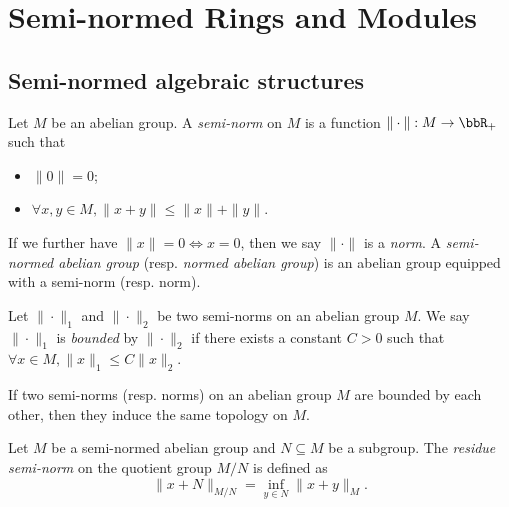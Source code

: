 \section{Semi-normed Rings and Modules}


\subsection{Semi-normed algebraic structures}

    \begin{definition}\label{def:semi-normed_abelian_group}
        Let \(M\) be an abelian group.
        A \emph{semi-norm} on \(M\) is a function \(\|\cdot\|: M \to \bbR_+\) such that
        \begin{itemize}
            \item \(\|0\| = 0\);
            \item \(\forall x,y \in M, \|x + y\| \leq \|x\| + \|y\|\).
        \end{itemize}
        If we further have \(\|x\| = 0 \iff x = 0\), then we say \(\|\cdot\|\) is a \emph{norm}.
        A \emph{semi-normed abelian group} (resp. \emph{normed abelian group}) is an abelian group equipped with a semi-norm (resp. norm).
    \end{definition}

    \begin{definition}\label{def:bounded_semi-norm}
        Let \(\|\cdot\|_1\) and \(\|\cdot\|_2\) be two semi-norms on an abelian group \(M\).
        We say \(\|\cdot\|_1\) is \emph{bounded} by \(\|\cdot\|_2\) if there exists a constant \(C > 0\) such that \(\forall x \in M, \|x\|_1 \leq C\|x\|_2\).
    \end{definition}

    \begin{remark}\label{rmk:semi-norms_bounded_by_each_other_induces_the_same_topologies}
        If two semi-norms (resp. norms) on an abelian group \(M\) are bounded by each other, then they induce the same topology on \(M\).
    \end{remark}

    \begin{definition}\label{def:residue_semi-norm}
        Let \(M\) be a semi-normed abelian group and \(N \subseteq M\) be a subgroup.
        The \emph{residue semi-norm} on the quotient group \(M/N\) is defined as
        \[
            \|x + N\|_{M/N} = \inf_{y \in N} \|x + y\|_M.
        \]
    \end{definition}

